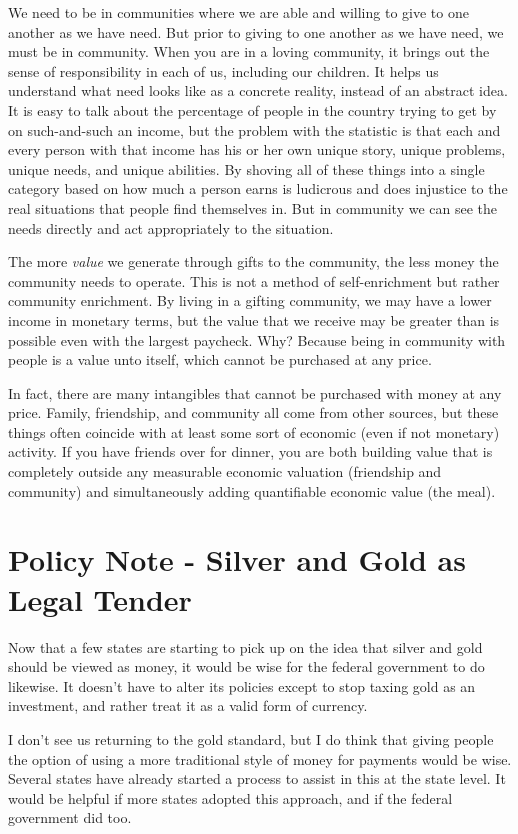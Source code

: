 We need to be in communities where we are able and willing to give to
one another as we have need. But prior to giving to one another as we
have need, we must be in community. When you are in a loving community,
it brings out the sense of responsibility in each of us, including our
children. It helps us understand what need looks like as a concrete
reality, instead of an abstract idea. It is easy to talk about the
percentage of people in the country trying to get by on such-and-such
an income, but the problem with the statistic is that each and every
person with that income has his or her own unique story, unique
problems, unique needs, and unique abilities. By shoving all of these
things into a single category based on how much a person earns is
ludicrous and does injustice to the real situations that people find
themselves in. But in community we can see the needs directly and act
appropriately to the situation. 

The more \textit{value} we generate through gifts to the community, the
less money the community needs to operate. This is not a method of
self-enrichment but rather community enrichment. By living in a gifting
community, we may have a lower income in monetary terms, but the value
that we receive may be greater than is possible even with the largest
paycheck. Why?  Because being in community with people is a value unto
itself, which cannot be purchased at any price.

In fact, there are many intangibles that cannot be purchased with money
at any price. Family, friendship, and community all come from other
sources, but these things often coincide with at least some sort of
economic (even if not monetary) activity. If you have friends over for
dinner, you are both building value that is completely outside any
measurable economic valuation (friendship and community) and
simultaneously adding quantifiable economic value (the meal).

\section{Policy Note - Silver and Gold as Legal Tender}

Now that a few states are starting to pick up on the idea that silver
and gold should be viewed as money, it would be wise for the federal
government to do likewise. It doesn’t have to alter its policies except
to stop taxing gold as an investment, and rather treat it as a valid
form of currency.

I don’t see us returning to the gold standard, but I do think that
giving people the option of using a more traditional style of money for
payments would be wise. Several states have already started a process
to assist in this at the state level. It would be helpful if more
states adopted this approach, and if the federal government did too.
